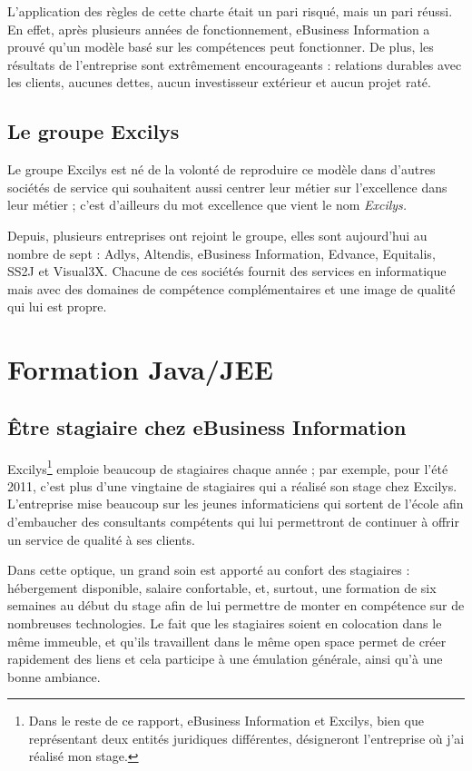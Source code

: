 L'application des règles de cette charte était un pari risqué, mais un pari réussi. En effet, après plusieurs années de fonctionnement, eBusiness Information a prouvé qu'un modèle basé sur les compétences peut fonctionner. De plus, les résultats de l'entreprise sont extrêmement encourageants : relations durables avec les clients, aucunes dettes, aucun investisseur extérieur et aucun projet raté.

\subsection{Le groupe Excilys}
Le groupe Excilys est né de la volonté de reproduire ce modèle dans d'autres sociétés de service qui souhaitent aussi centrer leur métier sur l'excellence dans leur métier ; c'est d'ailleurs du mot excellence que vient le nom \em{Excilys}.

Depuis, plusieurs entreprises ont rejoint le groupe, elles sont aujourd'hui au nombre de sept : Adlys, Altendis, eBusiness Information, Edvance, Equitalis, SS2J et Visual3X. Chacune de ces sociétés fournit des services en informatique mais avec des domaines de compétence complémentaires et une image de qualité qui lui est propre.
  
\section{Formation Java/JEE}

\subsection{Être stagiaire chez eBusiness Information}

Excilys\footnote{Dans le reste de ce rapport, eBusiness Information et Excilys, bien que représentant deux entités juridiques différentes, désigneront l'entreprise où j'ai réalisé mon stage.} emploie beaucoup de stagiaires chaque année ; par exemple, pour l'été 2011, c'est plus d'une vingtaine de stagiaires qui a réalisé son stage chez Excilys. L'entreprise mise beaucoup sur les jeunes informaticiens qui sortent de l'école afin d'embaucher des consultants compétents qui lui permettront de continuer à offrir un service  de qualité à ses clients.

Dans cette optique, un grand soin est apporté au confort des stagiaires : hébergement disponible, salaire confortable, et, surtout, une formation de six semaines au début du stage afin de lui permettre de monter en compétence sur de nombreuses technologies. Le fait que les stagiaires soient en colocation dans le même immeuble, et qu'ils travaillent dans le même open space permet de créer rapidement des liens et cela participe à une émulation générale, ainsi qu'à une bonne ambiance.

